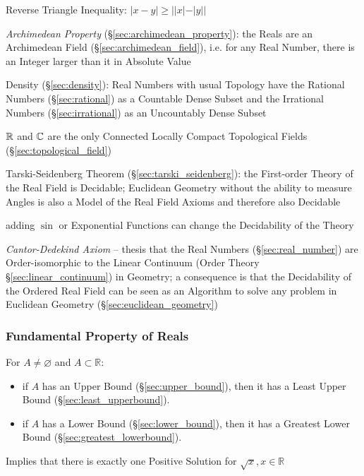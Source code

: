 Reverse Triangle Inequality: $|x - y| \geq ||x| - |y||$

\emph{Archimedean Property} (\S\ref{sec:archimedean_property}): the Reals are
an Archimedean Field (\S\ref{sec:archimedean_field}), i.e. for any Real Number,
there is an Integer larger than it in Absolute Value

Density (\S\ref{sec:density}): Real Numbers with usual Topology have the
Rational Numbers (\S\ref{sec:rational}) as a Countable Dense Subset and the
Irrational Numbers (\S\ref{sec:irrational}) as an Uncountably Dense Subset

$\mathbb{R}$ and $\mathbb{C}$ are the only Connected Locally Compact
Topological Fields (\S\ref{sec:topological_field})

Tarski-Seidenberg Theorem (\S\ref{sec:tarski_seidenberg}): the First-order
Theory of the Real Field is Decidable; Euclidean Geometry without the ability
to measure Angles is also a Model of the Real Field Axioms and therefore also
Decidable

adding $\sin$ or Exponential Functions can change the Decidability of the Theory

\emph{Cantor-Dedekind Axiom} -- thesis that the Real Numbers
(\S\ref{sec:real_number}) are Order-isomorphic to the Linear Continuum (Order
Theory \S\ref{sec:linear_continuum}) in Geometry; a consequence is that the
Decidability of the Ordered Real Field can be seen as an Algorithm to solve any
problem in Euclidean Geometry (\S\ref{sec:euclidean_geometry})



\subsubsection{Fundamental Property of Reals}
\label{sec:fundamental_property}

For $A \neq \varnothing$ and $A \subset \mathbb{R}$:
\begin{itemize}
  \item if $A$ has an Upper Bound (\S\ref{sec:upper_bound}), then it
    has a Least Upper Bound (\S\ref{sec:least_upperbound}).
  \item if $A$ has a Lower Bound (\S\ref{sec:lower_bound}), then it
    has a Greatest Lower Bound (\S\ref{sec:greatest_lowerbound}).
\end{itemize}

Implies that there is exactly one Positive Solution for $\sqrt{x}, x
\in \mathbb{R}$




